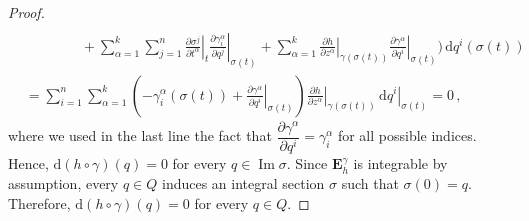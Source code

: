 \documentclass[11pt,twoside]{article}
\theoremstyle{plain}
\theoremstyle{definition}
\theoremstyle{remark}
\newcommand{\dd}{\mathrm{d}}
\DeclareMathOperator{\Ima}{Im}
\newcommand\restr[2]{\left.#1\right|_{#2}} \newcommand{\bfX}{\mathbf{X}} \newcommand{\bfY}{\mathbf{Y}} \newcommand{\bfZ}{\mathbf{Z}} \newcommand{\qeddiamond}{\hfill $\diamond$} \newcommand{\parder}[2]{\frac{\partial #1}{\partial #2}} \newcommand{\dparder}[2]{\dfrac{\partial #1}{\partial #2}} \newcommand{\tparder}[2]{\partial #1/\partial #2} \newcommand{\parderr}[3]{\frac{\partial^2 #1}{\partial #2\partial #3}} \newcommand{\dparderr}[3]{\dfrac{\partial^2 #1}{\partial #2\partial #3}} \newcommand{\tparderr}[3]{\partial^2 #1/\partial #2\partial #3}
\begin{document}
\begin{proof}
\begin{align*}
\\
&\qquad\qquad
  + \sum_{\alpha=1}^k \sum_{j=1}^n
    \restr{\frac{\partial \sigma^j}{\partial t^\alpha}}{t}
    \restr{\frac{\partial \gamma^\alpha_i}{\partial q^j}}{\sigma(t)}
  + \sum_{\alpha=1}^k
    \restr{\frac{\partial h}{\partial z^\alpha}}{\gamma(\sigma(t))}
    \restr{\frac{\partial \gamma^\alpha}{\partial q^i}}{\sigma(t)}
\Bigg)
\, \dd q^i(\sigma(t))
\\[1ex]
&=
\sum_{i=1}^n
\sum_{\alpha=1}^k
\left(
  - \gamma_i^\alpha(\sigma(t))
  + \restr{\frac{\partial \gamma^\alpha}{\partial q^i}}{\sigma(t)}
\right)
\restr{\frac{\partial h}{\partial z^\alpha}}{\gamma(\sigma(t))}
\, \restr{\dd q^i}{\sigma(t)} = 0\,,
\end{align*}
where we used in the last line the fact that $\dfrac{\partial \gamma^\alpha}{\partial q^i} = \gamma^\alpha_i$ for all possible indices. Hence, $\dd(h\circ \gamma)(q) = 0$ for every $q\in \Ima \sigma$. Since $\mathbf{E}_h^\gamma$ is integrable by assumption, every $q\in Q$ induces an integral section $\sigma$ such that $\sigma(0) = q$. Therefore, $\dd(h\circ\gamma)(q) = 0$ for every $q\in Q$.


\end{proof}
\end{document}
